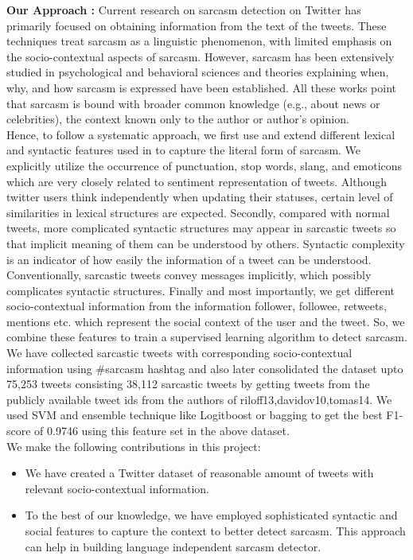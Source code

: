 \textbf{Our Approach :} Current research on sarcasm detection on Twitter \cite{riloff13,davidov10,tomas14,gonzalez_acl} has primarily focused on obtaining information from the text of the tweets. These techniques treat sarcasm as a linguistic phenomenon, with limited emphasis on the socio-contextual aspects of sarcasm. However, sarcasm has been extensively studied in psychological and behavioral sciences and theories explaining when, why, and how sarcasm is expressed have been established. All these works point that sarcasm is bound with broader common knowledge (e.g., about news or celebrities), the context known only to the author or author's opinion.\\
Hence, to follow a systematic approach, we first use and extend different lexical and syntactic features used in \cite{riloff13,davidov10,tomas14,gonzalez_acl} to capture the literal form of sarcasm. We explicitly utilize the occurrence of punctuation, stop words, slang, and emoticons which are very closely related to sentiment representation of tweets. Although twitter users think independently when updating their statuses, certain level of similarities in lexical structures are expected. Secondly, compared with normal tweets, more complicated syntactic structures may appear in sarcastic tweets so that implicit meaning of them can be understood by others. Syntactic complexity is an indicator of how easily the information of a tweet can be understood. Conventionally, sarcastic tweets convey messages implicitly, which possibly complicates syntactic structures. Finally and most importantly, we get different socio-contextual information from the information follower, followee, retweets, mentions etc. which represent the social context of the user and the tweet. So, we combine these features to train a supervised learning algorithm to detect sarcasm. We have collected sarcastic tweets with corresponding socio-contextual information using \#sarcasm hashtag and also later consolidated the dataset upto 75,253 tweets consisting 38,112 sarcastic tweets by getting tweets from the publicly available tweet ids from the authors of {riloff13,davidov10,tomas14}. We used SVM and ensemble technique like Logitboost or bagging to get the best F1-score of 0.9746 using this feature set in the above dataset.\\ 

\noindent We make the following contributions in this project:
\begin{itemize}
 \item We have created a Twitter dataset of reasonable amount of tweets with relevant socio-contextual information.
 \item To the best of our knowledge, we have employed sophisticated syntactic and social features to capture the context to better detect sarcasm. This approach can help in building language independent sarcasm detector.\\
\end{itemize}

